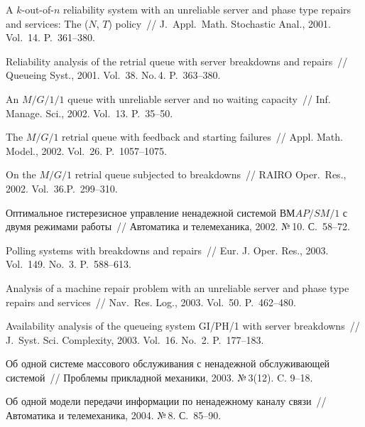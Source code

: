 \begin{multicols}{2}
{{\begin{thebibliography}{99}
A $k$-out-of-$n$ reliability system with an unreliable server and phase type repairs and services: 
The ($N$, $T$) policy~//
J.\ Appl.\ Math. Stochastic Anal., 2001. Vol.~14. P.~361--380.

Reliability analysis of the retrial queue with server breakdowns and repairs~//
Queueing Syst., 2001. Vol.~38. No.\,4. P.~363--380.


An $M/G/1/1$ queue with unreliable server and no waiting capacity~//
Inf. Manage. Sci., 2002. Vol.~13. P.~35--50.

The $M/G/1$ retrial queue with feedback and
starting failures~// Appl. Math. Model., 2002. Vol.~26. P.~1057--1075.

On the $M/G/1$ retrial queue subjected to breakdowns~//
RAIRO Oper.\ Res., 2002. Vol.~36.\linebreak P.~299--310.

Оптимальное гистерезисное управление ненадежной системой
$ВМAP/SM/1$ с двумя режимами работы~//
Автоматика и телемеханика, 2002. №\,10. С.~58--72.

Polling systems with breakdowns and repairs~//
Eur. J. Oper. Res., 2003. Vol.~149. No.~3. P.~588--613.

Analysis of a machine repair problem with an unreliable server and phase type repairs and services~//
Nav.\ Res. Log., 2003. Vol.~50. P.~462--480.

Availability analysis of the queueing system GI/PH/1 with server breakdowns~//
J.\ Syst. Sci. Complexity, 2003. Vol.~16. No.~2. P.~177--183.

Об одной системе массового обслуживания с ненадежной обслуживающей системой~//
Проблемы прикладной механики, 2003. №\,3(12). C. 9--18.

Об одной модели передачи информации по ненадежному каналу связи~//
Автоматика и телемеханика, 2004. №\,8. С.~85--90.



\end{thebibliography}}}
\end{multicols}
